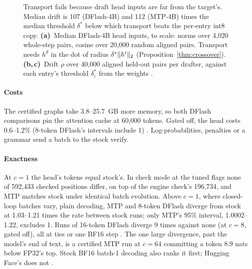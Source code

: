 \begin{figure}[t]
\centering
%
\caption{Transport fails because draft head inputs are far from the target's. Median drift is 107 (DFlash-4B) and 112 (MTP-4B) times the median threshold $\delta^\ast$ below which transport beats the per-entry int8 copy. \textbf{(a)}~Median DFlash-4B head inputs, to scale: norms over 4,020 whole-step pairs, cosine over 20,000 random aligned pairs. Transport needs $h^d$ in the dot of radius $\delta^\ast\lVert h^t\rVert_2$ (Proposition~\ref{thm:crossover}). \textbf{(b,\,c)}~Drift $\rho$ over 40,000 aligned held-out pairs per drafter, against each entry's threshold $\delta^\ast_i$ from the weights .}
\label{fig:rho}\label{fig:transport}
\end{figure}

\paragraph{Costs} The certified graphs take 3.8--25.7~GB more memory, so both DFlash comparisons pin the attention cache at 60,000 tokens. Gated off, the head costs 0.6--1.2\% (8-token DFlash's intervals include 1) . Log-probabilities, penalties or a grammar send a batch to the stock verify.

\paragraph{Exactness} At $c=1$ the head's tokens equal stock's. In check mode at the tuned flags none of 592,433 checked positions differ, on top of the engine check's 196,734, and MTP matches stock under identical batch evolution. Above $c=1$, where closed-loop batches vary, plain decoding, MTP and 8-token DFlash diverge from stock at 1.03--1.21 times the rate between stock runs; only MTP's 95\% interval, 1.0002--1.22, excludes 1. Runs of 16-token DFlash diverge 9 times against none (at $c=8$, gated off), all at ties or one BF16 step . The one large divergence, past the model's end of text, is a certified MTP run at $c=64$ committing a token 8.9 nats below FP32's top. Stock BF16 batch-1 decoding also ranks it first; Hugging Face's does not .
